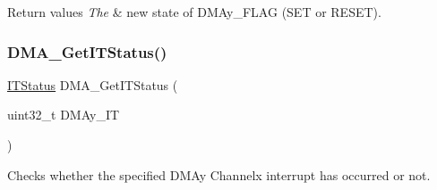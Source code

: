 \begin{DoxyRetVals}{Return values}
{\em The} & new state of D\+M\+Ay\+\_\+\+F\+L\+AG (S\+ET or R\+E\+S\+ET). \\
\hline
\end{DoxyRetVals}
\mbox{\label{group___d_m_a___exported___functions_ga9287331247150fe84d03ecd7ad8adb52}} 
\subsubsection{\texorpdfstring{DMA\_GetITStatus()}{DMA\_GetITStatus()}}
{\footnotesize\ttfamily \mbox{\hyperlink{group___exported__types_gaacbd7ed539db0aacd973a0f6eca34074}{I\+T\+Status}} D\+M\+A\+\_\+\+Get\+I\+T\+Status (\begin{DoxyParamCaption}\item[{uint32\+\_\+t}]{D\+M\+Ay\+\_\+\+IT }\end{DoxyParamCaption})}



Checks whether the specified D\+M\+Ay Channelx interrupt has occurred or not. 


